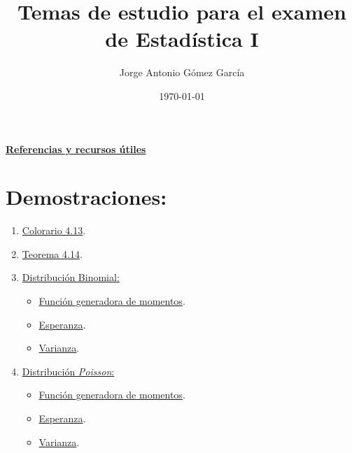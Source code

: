 \documentclass[8pt]{article}
\author{Jorge Antonio Gómez García}
\date{\today}
\title{Temas de estudio para el examen de Estadística I}
\begin{document}
\maketitle

\paragraph*{\hyperref[paragraph:assets]{Referencias y recursos útiles}}
\label{paragraph:assets_tag}


\section*{Demostraciones:}
\label{sec:demostraciones}

\begin{enumerate}

    \item \hyperref[subsec:colorario413]{Colorario 4.13}.
        \label{subsec:colorario413_tag}
    \item \hyperref[subsec:teorema414]{Teorema 4.14}.
        \label{subsec:teorema414_tag}

    \item \hyperref[subsec:distribucion_binomial]{Distribución Binomial:}
        \label{subsec:distribucion_binomial_tag}
    \begin{itemize}
        \item \hyperref[subsec:funciongeneradora_binom]{Función generadora de momentos}.
            \label{subsec:funciongeneradora_binom_tag}
        \item \hyperref[subsec:esperanza_binom]{Esperanza}.
            \label{subsec:esperanza_binom_tag}
        \item \hyperref[subsec:varianza_binom]{Varianza}.
            \label{subsec:varianza_binom_tag}
    \end{itemize}
    
    \item \hyperref[subsec:distribucion_poisson]{Distribución \textit{Poisson}:}
        \label{subsec:distribucion_poisson_tag}
    \begin{itemize}
        \item \hyperref[subsec:funciongeneradora_poisson]{Función generadora de momentos}.
            \label{subsec:funciongeneradora_poisson_tag}
        \item \hyperref[subsec:esperanza_poisson]{Esperanza}.
            \label{subsec:esperanza_poisson_tag}
        \item \hyperref[subsec:varianza_poisson]{Varianza}.
            \label{subsec:varianza_poisson_tag}
    \end{itemize}
    

\end{enumerate}
\end{document}
